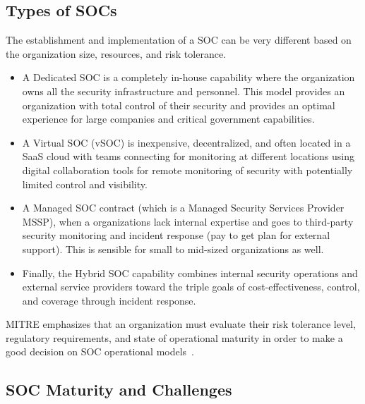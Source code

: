 \subsection{Types of SOCs}\vspace{-0.5em}

The establishment and implementation of a SOC can be very different based on the organization size, resources, and risk tolerance.
\begin{itemize}[noitemsep, topsep=0pt]
    \item A Dedicated SOC is a completely in-house capability where the organization owns all the security infrastructure and personnel. This model provides an organization with total control of their security and provides an optimal experience for large companies and critical government capabilities.
    \item A Virtual SOC (vSOC) is inexpensive, decentralized, and often located in a SaaS cloud with teams connecting for monitoring at different locations using digital collaboration tools for remote monitoring of security with potentially limited control and visibility.
    \item A Managed SOC contract (which is a Managed Security Services Provider MSSP), when a organizations lack internal expertise and goes to third-party security monitoring and incident response (pay to get plan for external support). This is sensible for small to mid-sized organizations as well.
    \item Finally, the Hybrid SOC capability combines internal security operations and external service providers toward the triple goals of cost-effectiveness, control, and coverage through incident response.
\end{itemize}
MITRE emphasizes that an organization must evaluate their risk tolerance level, regulatory requirements, and state of operational maturity in order to make a good decision on SOC operational models~\cite{mitre_soc}.

\subsection{SOC Maturity and Challenges}

